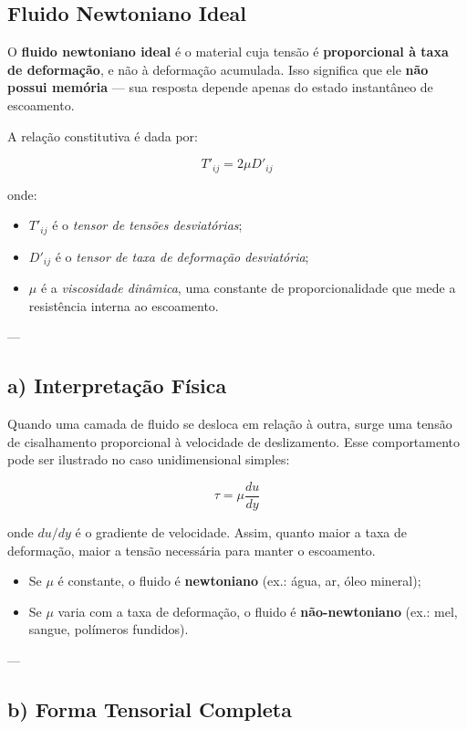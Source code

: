 \subsection{Fluido Newtoniano Ideal}

O \textbf{fluido newtoniano ideal} é o material cuja tensão é \textbf{proporcional à taxa de deformação}, e não à deformação acumulada.  
Isso significa que ele \textbf{não possui memória} — sua resposta depende apenas do estado instantâneo de escoamento.

A relação constitutiva é dada por:

\[
T'_{ij} = 2\mu D'_{ij}
\]

onde:
\begin{itemize}
    \item $T'_{ij}$ é o \textit{tensor de tensões desviatórias};
    \item $D'_{ij}$ é o \textit{tensor de taxa de deformação desviatória};
    \item $\mu$ é a \textit{viscosidade dinâmica}, uma constante de proporcionalidade que mede a resistência interna ao escoamento.
\end{itemize}

---

\subsection*{a) Interpretação Física}

Quando uma camada de fluido se desloca em relação à outra, surge uma tensão de cisalhamento proporcional à velocidade de deslizamento.  
Esse comportamento pode ser ilustrado no caso unidimensional simples:

\[
\tau = \mu \frac{du}{dy}
\]

onde $du/dy$ é o gradiente de velocidade.  
Assim, quanto maior a taxa de deformação, maior a tensão necessária para manter o escoamento.

\begin{itemize}
    \item Se $\mu$ é constante, o fluido é \textbf{newtoniano} (ex.: água, ar, óleo mineral);
    \item Se $\mu$ varia com a taxa de deformação, o fluido é \textbf{não-newtoniano} (ex.: mel, sangue, polímeros fundidos).
\end{itemize}

---

\subsection*{b) Forma Tensorial Completa}

